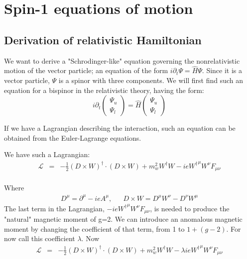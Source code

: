 
\section{Spin-1 equations of motion}



\subsection{Derivation of relativistic Hamiltonian}

We want to derive a "Schrodinger-like" equation governing the nonrelativistic motion of the vector particle; an equation of the form $i\partial_t \Psi = \hat{H} \Psi$.  Since it is a vector particle, $\Psi$ is a spinor with three components.  We will first find such an equation for a bispinor in the relativistic theory, having the form:
\[
i\partial_t 
\begin{pmatrix}
	\Psi_u	\\	\Psi_l
\end{pmatrix} 
=
\hat{H}
\begin{pmatrix}
	\Psi_u	\\	\Psi_l
\end{pmatrix}
\]


If we have a Lagrangian describing the interaction, such an equation can be obtained from the Euler-Lagrange equations.  


We have such a Lagrangian:
\begin{eqnarray*}
\mathcal{L} 
	&=&	-\frac{1}{2} (D \times W)^\dagger \cdot (D \times W) 
				+ m_w^2 W^\dagger W 
				- i e {W^\dagger}^\mu W^\nu F_{\mu \nu}	\\
\end{eqnarray*}

Where
\begin{eqnarray*}
		D^\mu	=	\partial^\mu - i e A^\mu ,
	&&
		D \times W = D^\mu W^\nu - D^\nu W^\mu
\end{eqnarray*}
The last term in the Lagrangian, $-ie{W^\dagger}^\mu W^\nu F_{\mu\nu}$, is needed to produce the "natural" magnetic moment of g=2.  We can introduce an anomalous magnetic moment by changing the coefficient of that term, from 1 to $1+(g-2)$.  For now call this coefficient $\lambda$.  Now
\begin{eqnarray*}
\mathcal{L} 
	&=&	-\frac{1}{2} (D \times W)^\dagger \cdot (D \times W) 
				+ m_w^2 W^\dagger W 
				- \lambda i e  {W^\dagger}^\mu W^\nu F_{\mu \nu}	\\
\end{eqnarray*}



